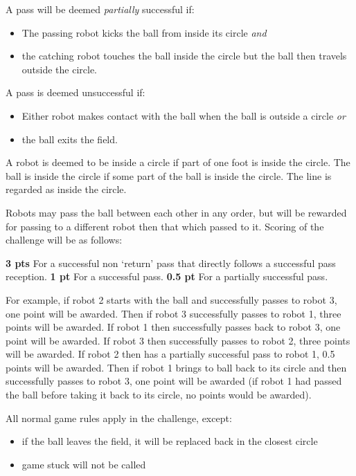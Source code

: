 \documentclass{article}
\begin{document}
A pass will be deemed \emph{partially} successful if:
\begin{itemize}
\item The passing robot kicks the ball from inside its circle \emph{and}
\item the catching robot touches the ball inside the circle but the ball then travels outside the circle.
\end{itemize}

A pass is deemed unsuccessful if:
\begin{itemize}
\item Either robot makes contact with the ball when the ball is outside a circle \emph{or}
\item the ball exits the field.
\end{itemize}

A robot is deemed to be inside a circle if part of one foot is inside the circle. The ball is
inside the circle if some part of the ball is inside the circle. The line is regarded as inside the circle.

Robots may pass the ball between each other in any order, but will be rewarded for passing
to a different robot then that which passed to it. Scoring of the challenge will be as
follows:

\textbf{3 pts} For a successful non `return' pass that directly follows a successful pass reception.
\textbf{1 pt} For a successful pass.
\textbf{0.5 pt} For a partially successful pass.

For example, if robot 2 starts with the ball and successfully passes to robot 3, one point will be awarded.  Then if robot 3 successfully passes to robot 1, three points will be awarded.  If robot 1 then successfully passes back to robot 3, one point will be awarded.  If robot 3 then successfully passes to robot 2, three points will be awarded.  If robot 2 then has a partially successful pass to robot 1, 0.5 points will be awarded.  Then if robot 1 brings to ball back to its circle and then successfully passes to robot 3, one point will be awarded (if robot 1 had passed the ball before taking it back to its circle, no points would be awarded).

All normal game rules apply in the challenge, except:
\begin{itemize}
\item if the ball leaves the field, it will be replaced back in the closest circle
\item game stuck will not be called
\end{itemize}
\end{document}

